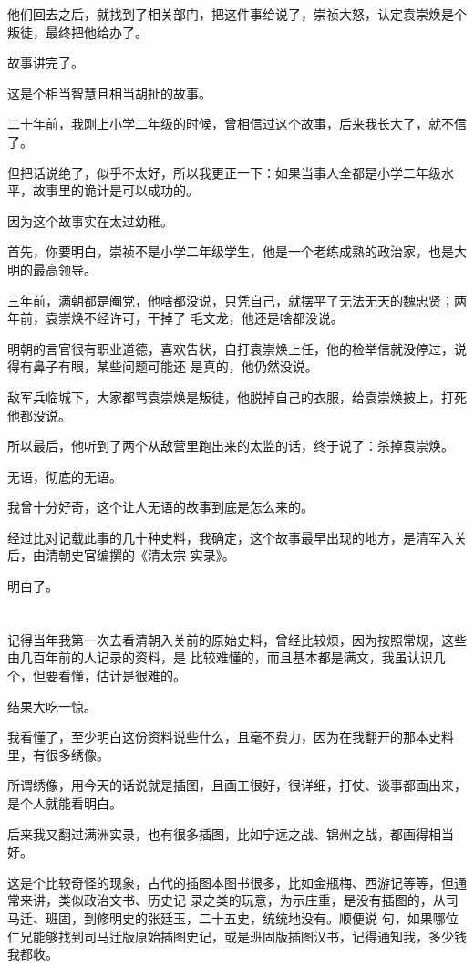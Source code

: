 \documentclass[11pt,a4paper,onecolumn]{article}
\begin{document}
他们回去之后，就找到了相关部门，把这件事给说了，崇祯大怒，认定袁崇焕是个叛徒，最终把他给办了。

故事讲完了。

这是个相当智慧且相当胡扯的故事。

二十年前，我刚上小学二年级的时候，曾相信过这个故事，后来我长大了，就不信了。

但把话说绝了，似乎不太好，所以我更正一下：如果当事人全都是小学二年级水平，故事里的诡计是可以成功的。

因为这个故事实在太过幼稚。

首先，你要明白，崇祯不是小学二年级学生，他是一个老练成熟的政治家，也是大明的最高领导。

三年前，满朝都是阉党，他啥都没说，只凭自己，就摆平了无法无天的魏忠贤；两年前，袁崇焕不经许可，干掉了
毛文龙，他还是啥都没说。

明朝的言官很有职业道德，喜欢告状，自打袁崇焕上任，他的检举信就没停过，说得有鼻子有眼，某些问题可能还
是真的，他仍然没说。

敌军兵临城下，大家都骂袁崇焕是叛徒，他脱掉自己的衣服，给袁崇焕披上，打死他都没说。

所以最后，他听到了两个从敌营里跑出来的太监的话，终于说了：杀掉袁崇焕。

无语，彻底的无语。

我曾十分好奇，这个让人无语的故事到底是怎么来的。

经过比对记载此事的几十种史料，我确定，这个故事最早出现的地方，是清军入关后，由清朝史官编撰的《清太宗
实录》。

明白了。

\section[\thesection]{}

记得当年我第一次去看清朝入关前的原始史料，曾经比较烦，因为按照常规，这些由几百年前的人记录的资料，是
比较难懂的，而且基本都是满文，我虽认识几个，但要看懂，估计是很难的。

结果大吃一惊。

我看懂了，至少明白这份资料说些什么，且毫不费力，因为在我翻开的那本史料里，有很多绣像。

所谓绣像，用今天的话说就是插图，且画工很好，很详细，打仗、谈事都画出来，是个人就能看明白。

后来我又翻过满洲实录，也有很多插图，比如宁远之战、锦州之战，都画得相当好。

这是个比较奇怪的现象，古代的插图本图书很多，比如金瓶梅、西游记等等，但通常来讲，类似政治文书、历史记
录之类的玩意，为示庄重，是没有插图的，从司马迁、班固，到修明史的张廷玉，二十五史，统统地没有。顺便说
句，如果哪位仁兄能够找到司马迁版原始插图史记，或是班固版插图汉书，记得通知我，多少钱我都收。
\end{document}
